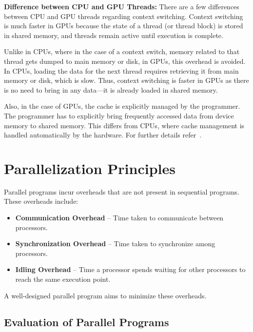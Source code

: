 \documentclass[12pt]{book}
\begin{document}
\textbf{Difference between CPU and GPU Threads:} There are a few differences between CPU and GPU threads regarding context switching. Context switching is much faster in GPUs because the state of a thread (or thread block) is stored in shared memory, and threads remain active until execution is complete. 

Unlike in CPUs, where in the case of a context switch, memory related to that thread gets dumped to main memory or disk, in GPUs, this overhead is avoided. In CPUs, loading the data for the next thread requires retrieving it from main memory or disk, which is slow. Thus, context switching is faster in GPUs as there is no need to bring in any data—it is already loaded in shared memory.

Also, in the case of GPUs, the cache is explicitly managed by the programmer. The programmer has to explicitly bring frequently accessed data from device memory to shared memory. This differs from CPUs, where cache management is handled automatically by the hardware. For further details refer~\cite{nvidia2020a100}.


\chapter{Parallelization Principles}

Parallel programs incur overheads that are not present in sequential programs. These overheads include:
\begin{itemize}
    \item \textbf{Communication Overhead} – Time taken to communicate between processors.
    \item \textbf{Synchronization Overhead} – Time taken to synchronize among processors.
    \item \textbf{Idling Overhead} – Time a processor spends waiting for other processors to reach the same execution point.
\end{itemize}
A well-designed parallel program aims to minimize these overheads.

\section{Evaluation of Parallel Programs}
\end{document}
